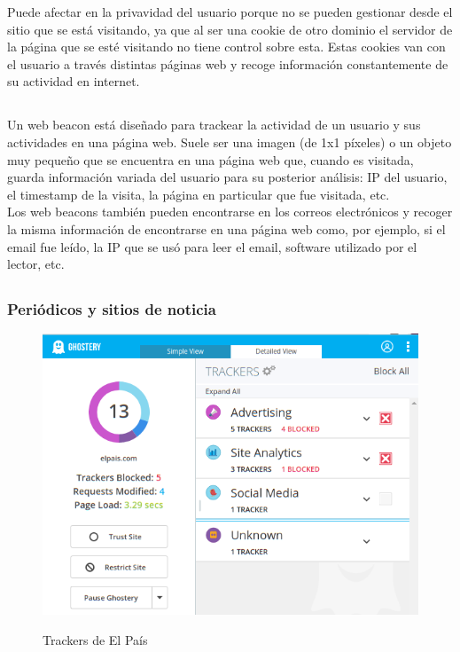 \documentclass[10pt,a4paper]{article}
\begin{document}
Puede afectar en la privavidad del usuario porque no se pueden gestionar desde el sitio que se está visitando, ya que al ser una cookie de otro dominio el servidor de la página que se esté visitando no tiene control sobre esta. Estas cookies van con el usuario a través distintas páginas web y recoge información constantemente de su actividad en internet.

\subsection{}

Un web beacon está diseñado para trackear la actividad de un usuario y sus actividades en una página web. Suele ser una imagen (de 1x1 píxeles) o un objeto muy pequeño que se encuentra en una página web que, cuando es visitada, guarda información variada del usuario para su posterior análisis: IP del usuario, el timestamp de la visita, la página en particular que fue visitada, etc. \\

Los web beacons también pueden encontrarse en los correos electrónicos y recoger la misma información de encontrarse en una página web como, por ejemplo, si el email fue leído, la IP que se usó para leer el email, software utilizado por el lector, etc.
\subsection{}

\subsubsection*{Periódicos y sitios de noticia}

\begin{figure}[H]
  \centering
  \includegraphics[scale=0.6]{ghost_elpais.png}\\
  \caption{Trackers de El País}
  \label{fig:object}
\end{figure}
\end{document}
